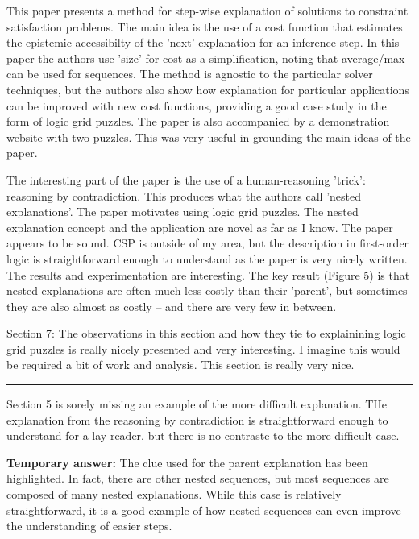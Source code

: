 \documentclass{article}
\newcommand\comment[1]{\marginpar{\tiny #1}}
\renewcommand\comment[1]{#1}
\newcommand{\tempanswer}[1]{{\comment{\color{orange} \textbf{Temporary answer:} #1}}}
\begin{document}
\begin{quoteit}
	This paper presents a method for step-wise explanation of solutions to
	constraint satisfaction problems. The main idea is the use of a cost
	function that estimates the epistemic accessibilty of the 'next'
	explanation for an inference step. In this paper the authors use 'size'
	for cost as a simplification, noting that average/max can be used for
	sequences.  The method is agnostic to the particular solver techniques,
	but the authors also show how explanation for particular applications
	can be improved with new cost functions, providing a good case study in
	the form of logic grid puzzles. The paper is also accompanied by a
	demonstration website with two puzzles. This was very useful in
	grounding the main ideas of the paper.
	
	The interesting part of the paper is the use of a human-reasoning
	'trick': reasoning by contradiction. This produces what the authors
	call 'nested explanations'. The paper motivates using logic grid
	puzzles. The nested explanation concept and the application are novel
	as far as I know. The paper appears to be sound. CSP is outside of my
	area, but the description in first-order logic is straightforward
	enough to understand as the paper is very nicely written. The results
	and experimentation are interesting. The key result (Figure 5) is that
	nested explanations are often much less costly than their 'parent', but
	sometimes they are also almost as costly -- and there are very few in
	between.
	
	
	Section 7: The observations in this section and how they tie to
	explainining logic grid puzzles is really nicely presented and very
	interesting. I imagine this would be required a bit of work and
	analysis. This section is really very nice.
	
	\rule{0.9\textwidth}{0.4pt}
	
Section 5 is sorely missing an example of the more difficult explanation. THe explanation from the reasoning by contradiction is straightforward enough to understand for a lay reader, but there is no contraste to the more difficult case.
\end{quoteit}

\tempanswer{The clue used for the parent explanation has been highlighted. In fact, there are other nested sequences, but most sequences are composed of many nested explanations. While this case is relatively straightforward, it is a good example of how nested sequences can even improve the understanding of easier steps.}
\end{document}
